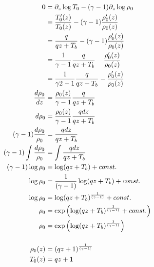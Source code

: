 \documentclass[10pt]{article}
\begin{document}
\begin{align*}
    0 &= \partial_z \log T_0 - (\gamma - 1) \partial_z \log \rho_0 \\
  &= \frac{T'_0(z)}{T_0(z)} - (\gamma - 1) \frac{\rho'_0(z)}{\rho_0(z)} \\
  &= \frac{q}{qz + T_b} - (\gamma - 1) \frac{\rho'_0(z)}{\rho_0(z)} \\
  &= \frac{1}{\gamma - 1}\frac{q}{qz + T_b} - \frac{\rho'_0(z)}{\rho_0(z)} \\
  &= \frac{1}{\gamma2 - 1}\frac{q}{qz + T_b} - \frac{\rho'_0(z)}{\rho_0(z)} \\
  \frac{d\rho_0}{dz} &= \frac{\rho_0(z)}{\gamma - 1}\frac{q}{qz + T_b} \\
  d\rho_0 &= \frac{\rho_0(z)}{\gamma - 1}\frac{qdz}{qz + T_b} \\
  (\gamma - 1) \frac{d\rho_0}{\rho_0}  &= \frac{qdz}{qz + T_b} \\
  (\gamma - 1) \int \frac{d\rho_0}{\rho_0}  &= \int \frac{qdz}{qz + T_b}\\
  (\gamma - 1) \log\rho_0  &= \log (qz + T_b)  + const. \\
  \log\rho_0  &= \frac{1}{(\gamma - 1)} \log (qz + T_b)  + const. \\
  \log\rho_0  &=  \log (qz + T_b)^{\frac{1}{(\gamma - 1)}}  + const. \\
  \rho_0  &=  \exp\left( \log (qz + T_b)^{\frac{1}{(\gamma - 1)}} + const.  \right) \\
  \rho_0  &=  \exp\left( \log (qz + T_b)^{\frac{1}{(\gamma - 1)}}\right)     \\
  \intertext{}
  \rho_0(z) &= (qz + 1)^{\frac{1}{(\gamma - 1)}}\\
  T_0(z) &= q z + 1\\
\end{align*}
\end{document}
